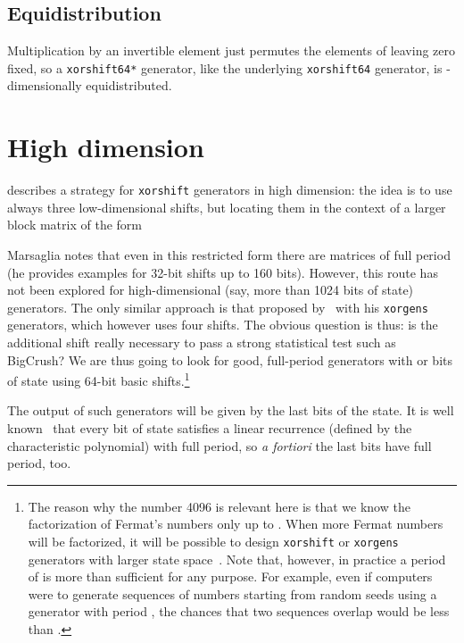\documentclass{acmsmalltr}
\newcommand{\xorshift}[1][]{\texttt{xorshift#1}\xspace}
\newcommand{\xorshifts}[1][]{\texttt{xorshift#1*}\xspace}
\newcommand{\xorgens}[1][]{\texttt{xorgens#1}\xspace}
\begin{document}
\subsection{Equidistribution}
\label{sec:equidistlcg}

Multiplication by an invertible element just permutes the elements of
 leaving zero fixed, so a \xorshifts[64] generator, like the
underlying \xorshift[64] generator, is -dimensionally
equidistributed.





\section{High dimension}
\label{sec:high}

 describes a strategy for \xorshift generators in high dimension: the idea
is to use always three low-dimensional shifts, but locating them in the context
of a larger  block matrix of the form

Marsaglia notes that even in this restricted form there are matrices of full period (he provides examples
for 32-bit shifts up to 160 bits). However, 
this route has not been explored for high-dimensional (say, more than 1024 bits
of state) generators. The only similar approach is that proposed by~ with his \xorgens generators, which however uses
four shifts. The obvious question is thus: is the additional shift
really necessary to pass a strong statistical test such as BigCrush? We are thus
going to look for good, full-period generators with  or  bits of state using 64-bit basic shifts.\footnote{The reason why the number 4096 is
relevant here is that we know the factorization of Fermat's numbers 
only up to . When more Fermat numbers will be factorized, it will be
possible to design \xorshift or \xorgens generators with larger state
space~\cite{BreSLPRNGUSX}. Note that, however, in practice a period of
 is more than sufficient for any purpose. For example, even if
 computers were to generate sequences of  numbers starting
from random seeds using a generator with period , the chances that two
sequences overlap would be less than .} 

The output of such generators will be given by the last  bits of
the state. It is well known~\cite{BreNMXRNG,NieRNGQMCM} that every bit of
state satisfies a linear recurrence (defined by the characteristic
polynomial) with full period, so \textit{a fortiori} the last  bits
have full period, too. 
\end{document}
